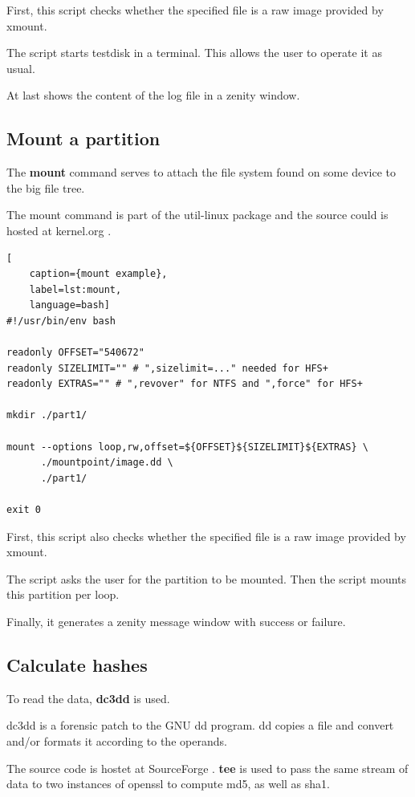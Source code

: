 \noindent First, this script checks whether the specified file is a raw image provided by xmount.

The script starts testdisk in a terminal. This allows the user to operate it as usual.

At last shows the content of the log file in a zenity window.

\subsection{Mount a partition}

The \textbf{mount} command serves to attach the file system found on some device to the big file tree.

The mount command is part of the util-linux package and the source could is hosted at kernel.org \cite{UtilLinux}.

\begin{lstlisting}[
    caption={mount example},
    label=lst:mount,
    language=bash]
#!/usr/bin/env bash

readonly OFFSET="540672"
readonly SIZELIMIT="" # ",sizelimit=..." needed for HFS+
readonly EXTRAS="" # ",revover" for NTFS and ",force" for HFS+

mkdir ./part1/

mount --options loop,rw,offset=${OFFSET}${SIZELIMIT}${EXTRAS} \
      ./mountpoint/image.dd \
      ./part1/

exit 0
\end{lstlisting}

\noindent First, this script also checks whether the specified file is a raw image provided by xmount.

The script asks the user for the partition to be mounted. Then the script mounts this partition per loop.

Finally, it generates a zenity message window with success or failure.

\subsection{Calculate hashes}

To read the data, \textbf{dc3dd} is used.

dc3dd is a forensic patch to the GNU dd program.
dd copies a file and convert and/or formats it according to the operands.

The source code is hostet at SourceForge \cite{Dc3dd}.\newline
\newline
\noindent \textbf{tee} is used to pass the same stream of data to two instances of openssl to compute md5, as well as sha1.


